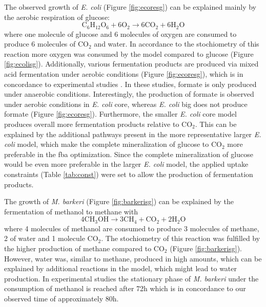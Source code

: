 The observed growth of \emph{E. coli} (Figure \hyperref[fig:ecoresg]{\ref{fig:ecoresg}}) can be explained mainly by the aerobic respiration of glucose:
\[
  \textrm{C}_{6}\textrm{H}_{12}\textrm{O}_{6} + 6\textrm{O}_2 \rightarrow 6\textrm{CO}_{2} + 6 \textrm{H}_{2}\textrm{O}
\]
where one molecule of glucose and 6 molecules of oxygen are consumed to produce 6 molecules of CO$_2$ and water. In accordance to the stochiometry of this reaction more oxygen was consumed by the model compared to glucose (Figure \hyperref[fig:ecolisg]{\ref{fig:ecolisg}}). Additionally, various fermentation products are produced via mixed acid fermentation under aerobic conditions (Figure \hyperref[fig:ecoresg]{\ref{fig:ecoresg}}), which is in concordance to experimental studies \cite{Sunya13}.
In these studies, formate is only produced under anaerobic conditions. Interestingly, the production of formate is observed under aerobic conditions in \emph{E. coli} core, whereas \emph{E. coli} big does not produce formate (Figure \hyperref[fig:ecoresg]{\ref{fig:ecoresg}}).
Furthermore, the smaller \emph{E. coli} core model produces overall more fermentation products relative to CO$_2$. This can be explained by the additional pathways present in the more representative larger \emph{E. coli} model, which make the complete mineralization of glucose to CO$_2$ more preferable in the fba optimization.
Since the complete mineralization of glucose would be even more preferable in the larger \emph{E. coli} model, the applied uptake constraints (Table \hyperref[ab:const]{\ref{tab:const}}) were set to allow the production of fermentation products.

The growth of \emph{M. barkeri} (Figure \hyperref[fig:barkerisg]{\ref{fig:barkerisg}}) can be explained by the fermentation of methanol to methane with
\[
  4\textrm{CH}_{3}\textrm{OH} \rightarrow 3\textrm{CH}_{4} + \textrm{CO}_{2} + 2\textrm{H}_{2}\textrm{O}
\]
where 4 molecules of methanol are consumed to produce 3 molecules of methane, 2 of water and 1 molecule CO$_2$.
The stochiometry of this reaction was fulfilled by the higher production of methane compared to CO$_2$ (Figure \hyperref[fig:barkerisg]{\ref{fig:barkerisg}}). However, water was, similar to methane, produced in high amounts, which can be explained by additional reactions in the model, which might lead to water production.
In experimental studies the stationary phase of \emph{M. barkeri} under the consumption of methanol is reached after 72\;h \cite{Hippe79} which is in concordance to our observed time of approximately 80\;h. 

